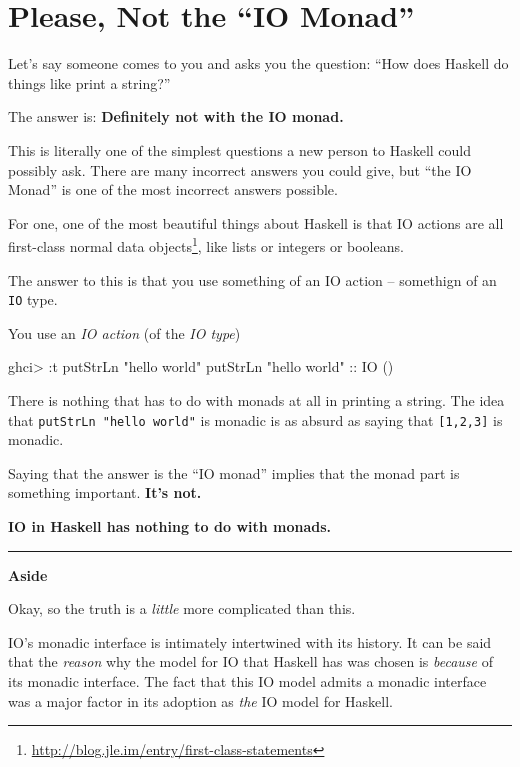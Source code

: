 \documentclass[]{article}
\newenvironment{Shaded}{}{}
\newcommand{\DataTypeTok}[1]{\textcolor[rgb]{0.56,0.13,0.00}{{#1}}}
\newcommand{\StringTok}[1]{\textcolor[rgb]{0.25,0.44,0.63}{{#1}}}
\newcommand{\OtherTok}[1]{\textcolor[rgb]{0.00,0.44,0.13}{{#1}}}
\newcommand{\FunctionTok}[1]{\textcolor[rgb]{0.02,0.16,0.49}{{#1}}}
\newcommand{\NormalTok}[1]{{#1}}
\renewcommand{\href}[2]{#2\footnote{\url{#1}}}
\begin{document}
\section{\texorpdfstring{Please, Not the ``IO
Monad''}{Please, Not the IO Monad}}\label{please-not-the-io-monad}

Let's say someone comes to you and asks you the question: ``How does Haskell do
things like print a string?''

The answer is: \textbf{Definitely not with the IO monad.}

This is literally one of the simplest questions a new person to Haskell could
possibly ask. There are many incorrect answers you could give, but ``the IO
Monad'' is one of the most incorrect answers possible.

For one, one of the most beautiful things about Haskell is that IO actions are
all \href{http://blog.jle.im/entry/first-class-statements}{first-class normal
data objects}, like lists or integers or booleans.

The answer to this is that you use something of an IO action -- somethign of an
\texttt{IO} type.

You use an \emph{IO action} (of the \emph{IO type})

\begin{Shaded}
\begin{Highlighting}[]
\NormalTok{ghci}\FunctionTok{>} \FunctionTok{:}\NormalTok{t putStrLn }\StringTok{"hello world"}
\NormalTok{putStrLn }\StringTok{"hello world"}\OtherTok{ ::} \DataTypeTok{IO} \NormalTok{()}
\end{Highlighting}
\end{Shaded}

There is nothing that has to do with monads at all in printing a string. The
idea that \texttt{putStrLn\ "hello\ world"} is monadic is as absurd as saying
that \texttt{{[}1,2,3{]}} is monadic.

Saying that the answer is the ``IO monad'' implies that the monad part is
something important. \textbf{It's not.}

\textbf{IO in Haskell has nothing to do with monads.}

\begin{center}\rule{0.5\linewidth}{\linethickness}\end{center}

\textbf{Aside}

Okay, so the truth is a \emph{little} more complicated than this.

IO's monadic interface is intimately intertwined with its history. It can be
said that the \emph{reason} why the model for IO that Haskell has was chosen is
\emph{because} of its monadic interface. The fact that this IO model admits a
monadic interface was a major factor in its adoption as \emph{the} IO model for
Haskell.
\end{document}
